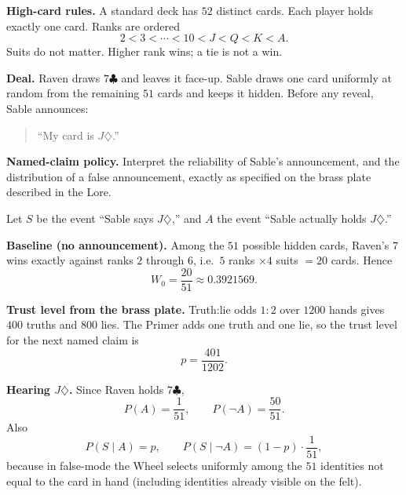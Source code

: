 \Problem

\textbf{High-card rules.} A standard deck has \(52\) distinct cards. Each player holds exactly one card. Ranks are ordered
\[
2<3<\cdots<10<J<Q<K<A.
\]
Suits do not matter. Higher rank wins; a tie is not a win.

\medskip

\textbf{Deal.} Raven draws \(7\clubsuit\) and leaves it face-up. Sable draws one card uniformly at random from the remaining \(51\) cards and keeps it hidden. Before any reveal, Sable announces:

\begin{quote}
``My card is \(J\diamondsuit\).''
\end{quote}

\medskip

\textbf{Named-claim policy.} Interpret the reliability of Sable's announcement, and the distribution of a false announcement, exactly as specified on the brass plate described in the Lore.


\SolutionPage

Let \(S\) be the event ``Sable says \(J\diamondsuit\),'' and \(A\) the event ``Sable actually holds \(J\diamondsuit\).''

\medskip

\textbf{Baseline (no announcement).}
Among the \(51\) possible hidden cards, Raven's \(7\) wins exactly against ranks \(2\) through \(6\), i.e.\ \(5\) ranks \(\times 4\) suits \(=20\) cards. Hence
\[
W_0=\frac{20}{51}\approx 0.3921569.
\]

\medskip

\textbf{Trust level from the brass plate.}
Truth:lie odds \(1:2\) over \(1200\) hands gives \(400\) truths and \(800\) lies. The Primer adds one truth and one lie, so the trust level for the next named claim is
\[
p=\frac{401}{1202}.
\]

\medskip

\textbf{Hearing \(J\diamondsuit\).}
Since Raven holds \(7\clubsuit\),
\[
P(A)=\frac{1}{51},\qquad P(\neg A)=\frac{50}{51}.
\]
Also
\[
P(S\mid A)=p,\qquad P(S\mid \neg A)=(1-p)\cdot\frac{1}{51},
\]
because in false-mode the Wheel selects uniformly among the \(51\) identities not equal to the card in hand (including identities already visible on the felt).

